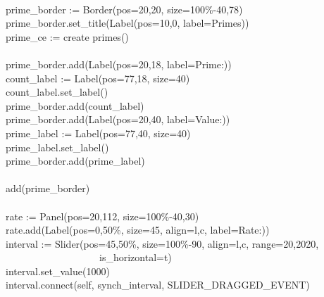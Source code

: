 {\ \\
\>   \ \ \ prime\_border :=
Border({\textquotedbl}pos=20,20{\textquotedbl},
{\textquotedbl}size=100\%-40,78{\textquotedbl}) \\
\>   \ \ \ prime\_border.set\_title(Label({\textquotedbl}pos=10,0{\textquotedbl},
{\textquotedbl}label=Primes{\textquotedbl})) \\
\>   \ \ \ prime\_ce := create primes() \\
\ \\
\>   \ \ \ prime\_border.add(Label({\textquotedbl}pos=20,18{\textquotedbl},
{\textquotedbl}label=Prime:{\textquotedbl})) \\
\>   \ \ \ count\_label :=
Label({\textquotedbl}pos=77,18{\textquotedbl},
{\textquotedbl}size=40{\textquotedbl}) \\
\>   \ \ \ count\_label.set\_label({\textquotedbl}{\textquotedbl}) \\
\>   \ \ \ prime\_border.add(count\_label) \\
\>   \ \ \ prime\_border.add(Label({\textquotedbl}pos=20,40{\textquotedbl},
{\textquotedbl}label=Value:{\textquotedbl})) \\
\>   \ \ \ prime\_label :=
Label({\textquotedbl}pos=77,40{\textquotedbl},
{\textquotedbl}size=40{\textquotedbl}) \\
\>   \ \ \ prime\_label.set\_label({\textquotedbl}{\textquotedbl}) \\
\>   \ \ \ prime\_border.add(prime\_label) \\
\ \\
\>   \ \ \ add(prime\_border) \\
\ \\
\>   \ \ \ rate := Panel({\textquotedbl}pos=20,112{\textquotedbl},
{\textquotedbl}size=100\%-40,30{\textquotedbl}) \\
\>   \ \ \ rate.add(Label({\textquotedbl}pos=0,50\%{\textquotedbl},
{\textquotedbl}size=45{\textquotedbl},
{\textquotedbl}align=l,c{\textquotedbl},
{\textquotedbl}label=Rate:{\textquotedbl})) \\
\>   \ \ \ interval :=
Slider({\textquotedbl}pos=45,50\%{\textquotedbl},
{\textquotedbl}size=100\%-90{\textquotedbl},
{\textquotedbl}align=l,c{\textquotedbl},
{\textquotedbl}range=20,2020{\textquotedbl}, \\
\>   \ \ \ \ \ \ \ \ \ \ \ \ \ \ \ \ \ \ \ \ \ \ {\textquotedbl}is\_horizontal=t{\textquotedbl}) \\
\>   \ \ \ interval.set\_value(1000) \\
\>   \ \ \ interval.connect(self,
{\textquotedbl}synch\_interval{\textquotedbl}, SLIDER\_DRAGGED\_EVENT) \\
}
